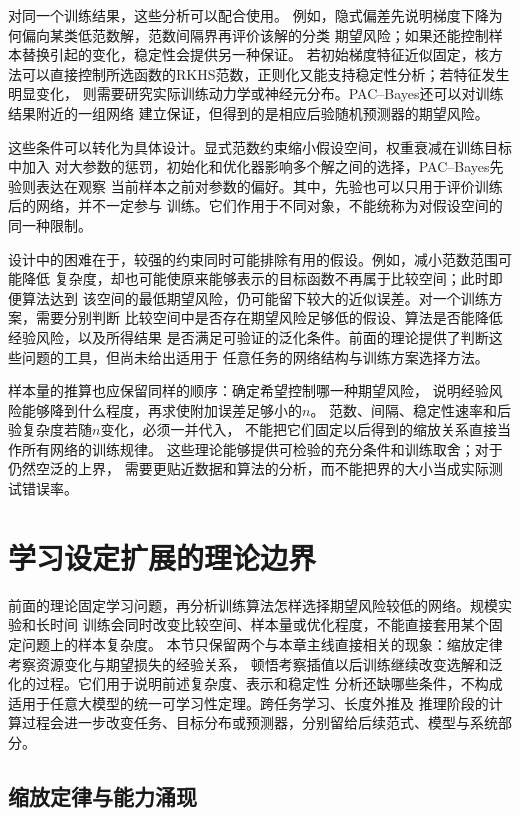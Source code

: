 对同一个训练结果，这些分析可以配合使用。
例如，隐式偏差先说明梯度下降为何偏向某类低范数解，范数间隔界再评价该解的分类
期望风险；如果还能控制样本替换引起的变化，稳定性会提供另一种保证。
若初始梯度特征近似固定，核方法可以直接控制所选函数的RKHS范数，正则化又能支持稳定性分析；若特征发生明显变化，
则需要研究实际训练动力学或神经元分布。PAC--Bayes还可以对训练结果附近的一组网络
建立保证，但得到的是相应后验随机预测器的期望风险。

这些条件可以转化为具体设计。显式范数约束缩小假设空间，权重衰减在训练目标中加入
对大参数的惩罚，初始化和优化器影响多个解之间的选择，PAC--Bayes先验则表达在观察
当前样本之前对参数的偏好。其中，先验也可以只用于评价训练后的网络，并不一定参与
训练。它们作用于不同对象，不能统称为对假设空间的同一种限制。

设计中的困难在于，较强的约束同时可能排除有用的假设。例如，减小范数范围可能降低
复杂度，却也可能使原来能够表示的目标函数不再属于比较空间；此时即便算法达到
该空间的最低期望风险，仍可能留下较大的近似误差。对一个训练方案，需要分别判断
比较空间中是否存在期望风险足够低的假设、算法是否能降低经验风险，以及所得结果
是否满足可验证的泛化条件。前面的理论提供了判断这些问题的工具，但尚未给出适用于
任意任务的网络结构与训练方案选择方法。

样本量的推算也应保留同样的顺序：确定希望控制哪一种期望风险，
说明经验风险能够降到什么程度，再求使附加误差足够小的$n$。
范数、间隔、稳定性速率和后验复杂度若随$n$变化，必须一并代入，
不能把它们固定以后得到的缩放关系直接当作所有网络的训练规律。
这些理论能够提供可检验的充分条件和训练取舍；对于仍然空泛的上界，
需要更贴近数据和算法的分析，而不能把界的大小当成实际测试错误率。

\FloatBarrier
\section{学习设定扩展的理论边界}
\label{sec:deep-learning-boundaries}

前面的理论固定学习问题，再分析训练算法怎样选择期望风险较低的网络。规模实验和长时间
训练会同时改变比较空间、样本量或优化程度，不能直接套用某个固定问题上的样本复杂度。
本节只保留两个与本章主线直接相关的现象：缩放定律考察资源变化与期望损失的经验关系，
顿悟考察插值以后训练继续改变选解和泛化的过程。它们用于说明前述复杂度、表示和稳定性
分析还缺哪些条件，不构成适用于任意大模型的统一可学习性定理。跨任务学习、长度外推及
推理阶段的计算过程会进一步改变任务、目标分布或预测器，分别留给后续范式、模型与系统部分。

\subsection{缩放定律与能力涌现}
\label{sec:scaling-laws}
\label{sec:emergent-capabilities}


